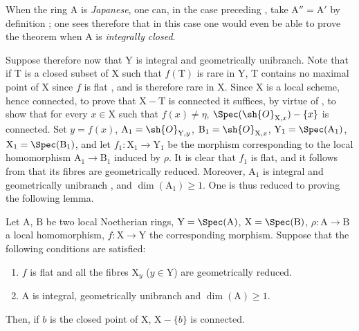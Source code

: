 \begin{remark}[18.9.7.1]
\label{IV.18.9.7.1}
When the ring A is \emph{Japanese}, one can, in the case preceding , take $\mathrm{A}''=\mathrm{A}'$ by definition ;
one sees therefore that in this case one would even be able to prove the theorem when A is \emph{integrally closed}.
\end{remark}

\begin{env}[18.9.7.2]
\label{IV.18.9.7.2}
Suppose therefore now that Y is integral and geometrically unibranch.
Note that if T is a closed subset of X such that $f(\mathrm{T})$ is rare in Y, T contains no maximal point of X since $f$ is flat , and is therefore rare in X.
Since X is a local scheme, hence connected, to prove that $\mathrm{X}-\mathrm{T}$ is connected it suffices, by virtue of , to show that for every $x\in\mathrm{X}$ such that $f(x)\neq\eta$, $\Spec(\sh{O}_{\mathrm{X},x})-\{x\}$ is connected.
Set $y=f(x)$, $\mathrm{A}_1=\sh{O}_{\mathrm{Y},y}$, $\mathrm{B}_1=\sh{O}_{\mathrm{X},x}$, $\mathrm{Y}_1=\Spec(\mathrm{A}_1)$, $\mathrm{X}_1=\Spec(\mathrm{B}_1)$, and let $f_1:\mathrm{X}_1\to\mathrm{Y}_1$ be the morphism corresponding to the local homomorphism $\mathrm{A}_1\to\mathrm{B}_1$ induced by $\rho$.
It is clear that $f_1$ is flat, and it follows from  that its fibres are geometrically reduced.
Moreover, $\mathrm{A}_1$ is integral and geometrically unibranch , and $\dim(\mathrm{A}_1)\geq 1$.
One is thus reduced to proving the following lemma.
\end{env}

\begin{lemma}[18.9.7.3]
\label{IV.18.9.7.3}
Let $\mathrm{A}$, $\mathrm{B}$ be two local Noetherian rings, $\mathrm{Y}=\Spec(\mathrm{A})$, $\mathrm{X}=\Spec(\mathrm{B})$, $\rho:\mathrm{A}\to\mathrm{B}$ a local homomorphism, $f:\mathrm{X}\to\mathrm{Y}$ the corresponding morphism.
Suppose that the following conditions are satisfied:
\begin{enumerate}[label=\emph{\roman*)}]
  \item $f$ is flat and all the fibres $\mathrm{X}_y$ ($y\in\mathrm{Y}$) are geometrically reduced.
  \item A is integral, geometrically unibranch and $\dim(\mathrm{A})\geq 1$.
\end{enumerate}
Then, if $b$ is the closed point of $\mathrm{X}$, $\mathrm{X}-\{b\}$ is connected.
\end{lemma}

